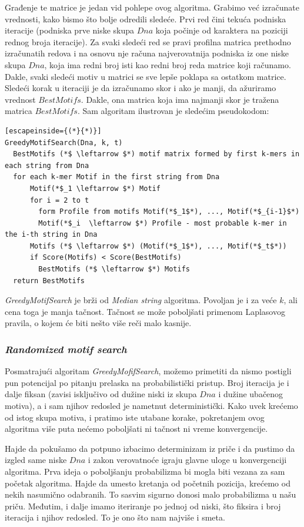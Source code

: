 Građenje te matrice je jedan vid pohlepe ovog algoritma. Grabimo već izračunate vrednosti, kako bismo što bolje odredili sledeće. Prvi red čini tekuća podniska iteracije (podniska prve niske skupa $Dna$ koja počinje od karaktera na poziciji rednog broja iteracije). Za svaki sledeći red se pravi profilna matrica prethodno izračunatih redova i na osnovu nje računa najverovatnija podniska iz one niske skupa $Dna$, koja ima redni broj isti kao redni broj reda matrice koji računamo. Dakle, svaki sledeći motiv u matrici se sve lepše poklapa sa ostatkom matrice. Sledeći korak u iteraciji je da izračunamo skor i ako je manji, da ažuriramo vrednost $BestMotifs$. Dakle, ona matrica koja ima najmanji skor je tražena matrica $BestMotifs$. Sam algoritam ilustrovan je sledećim pseudokodom:


\begin{lstlisting}[escapeinside={(*}{*)}]
GreedyMotifSearch(Dna, k, t)
  BestMotifs (*$ \leftarrow $*) motif matrix formed by first k-mers in each string from Dna
  for each k-mer Motif in the first string from Dna
      Motif(*$_1 \leftarrow $*) Motif
      for i = 2 to t
        form Profile from motifs Motif(*$_1$*), ..., Motif(*$_{i-1}$*)
        Motif(*$_i  \leftarrow $*) Profile - most probable k-mer in the i-th string in Dna
      Motifs (*$ \leftarrow $*) (Motif(*$_1$*), ..., Motif(*$_t$*))
	  if Score(Motifs) < Score(BestMotifs)
        BestMotifs (*$ \leftarrow $*) Motifs
  return BestMotifs
\end{lstlisting}

\textit{GreedyMotifSearch} je brži od \textit{Median string} algoritma. Povoljan je i za veće $k$, ali cena toga je manja tačnost. Tačnost se može poboljšati primenom Laplasovog pravila, o kojem će biti nešto više reči malo kasnije.

\subsubsection{\textit{Randomized motif search}}
Posmatrajući algoritam \textit{GreedyMofifSearch}, možemo primetiti da nismo postigli pun potencijal po pitanju prelaska na probabilistički pristup. Broj iteracija je i dalje fiksan (zavisi isključivo od dužine niski iz skupa $Dna$ i dužine ubačenog motiva), a i sam njihov redosled je nametnut deterministički. Kako uvek krećemo od istog skupa motiva, i pratimo iste utabane korake, pokretanjem ovog algoritma više puta nećemo poboljšati ni tačnost ni vreme konvergencije. 

Hajde da pokušamo da potpuno izbacimo determinizam iz priče i da pustimo da izgled same niske $Dna$ i zakon verovatnoće igraju glavne uloge u konvergenciji algoritma. Prva ideja o poboljšanju probabilizma bi mogla biti vezana za sam početak algoritma. Hajde da umesto kretanja od početnih pozicija, krećemo od nekih nasumično odabranih. To sasvim sigurno donosi malo probabilizma u našu priču. Međutim, i dalje imamo iteriranje po jednoj od niski, što fiksira i broj iteracija i njihov redosled. To je ono što nam najviše i smeta. 

